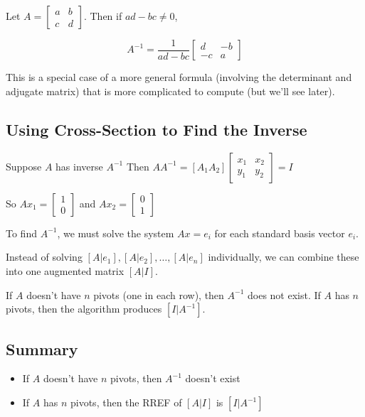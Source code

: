 \documentclass[11pt,a4paper]{article}
\begin{document}
Let $A = \begin{bmatrix} a & b \\ c & d \end{bmatrix}$. Then if $ad-bc \neq 0$,

\[A^{-1} = \frac{1}{ad-bc} \begin{bmatrix} d & -b \\ -c & a \end{bmatrix}\]

This is a special case of a more general formula (involving the determinant and adjugate matrix) that is more complicated to compute (but we'll see later).

\subsection{Using Cross-Section to Find the Inverse}

Suppose $A$ has inverse $A^{-1}$
Then $AA^{-1} = [A_1 A_2] \begin{bmatrix} x_1 & x_2 \\ y_1 & y_2 \end{bmatrix} = I$

So $Ax_1 = \begin{bmatrix} 1 \\ 0 \end{bmatrix}$ and $Ax_2 = \begin{bmatrix} 0 \\ 1 \end{bmatrix}$

To find $A^{-1}$, we must solve the system $Ax = e_i$ for each standard basis vector $e_i$.

Instead of solving $[A|e_1], [A|e_2], \ldots, [A|e_n]$ individually, we can combine these into one augmented matrix $[A|I]$.

If $A$ doesn't have $n$ pivots (one in each row), then $A^{-1}$ does not exist.
If $A$ has $n$ pivots, then the algorithm produces $[I|A^{-1}]$.

\subsection{Summary}

\begin{itemize}
    \item If $A$ doesn't have $n$ pivots, then $A^{-1}$ doesn't exist
    \item If $A$ has $n$ pivots, then the RREF of $[A|I]$ is $[I|A^{-1}]$
\end{itemize}
\end{document}
